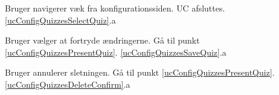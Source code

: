 \ucdescriptionend %

\ucextension
	{Bruger navigerer væk fra konfigurationssiden.}
	{UC afsluttes.}
	{\ref{ucConfigQuizzesSelectQuiz}.a}

\ucextension
	{Bruger vælger at fortryde ændringerne.}
	{Gå til punkt \ref{ucConfigQuizzesPresentQuiz}.}
	{\ref{ucConfigQuizzesSaveQuiz}.a}

\ucextension
	{Bruger annulerer sletningen.}
	{Gå til punkt \ref{ucConfigQuizzesPresentQuiz}.}
	{\ref{ucConfigQuizzesDeleteConfirm}.a}

